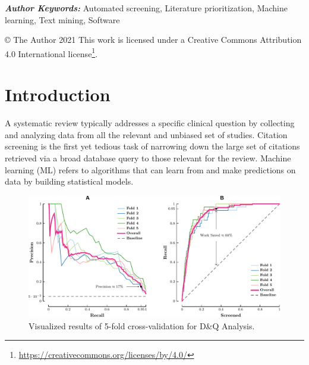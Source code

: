 \documentclass[10pt,twocolumn,letterpaper]{article}
\providecommand{\keywords}[1]{\textbf{\textit{Author Keywords:}} #1}
\begin{document}
\keywords{Automated screening, Literature prioritization, Machine learning, Text mining, Software}

© The Author 2021 This work is licensed under a Creative Commons Attribution 4.0 International license\footnote{\url{https://creativecommons.org/licenses/by/4.0/}}.

\newpage
\section{Introduction}
  
A systematic review typically addresses a specific clinical question by collecting and analyzing data from all the relevant and unbiased set of studies. Citation screening is the first yet tedious task of narrowing down the large set of citations retrieved via a broad database query to those relevant for the review. Machine learning (ML) refers to algorithms that can learn from and make predictions on data by building statistical models.

\begin{figure}[ht]
\centering
\includegraphics[width=1\textwidth]{../figures/performance-evaluation/combined/performance-evaluation-crop.pdf}
\caption{Visualized results of 5-fold cross-validation for D\&Q Analysis.}
\label{fig:performance-evaluation}
\end{figure}
\end{document}

